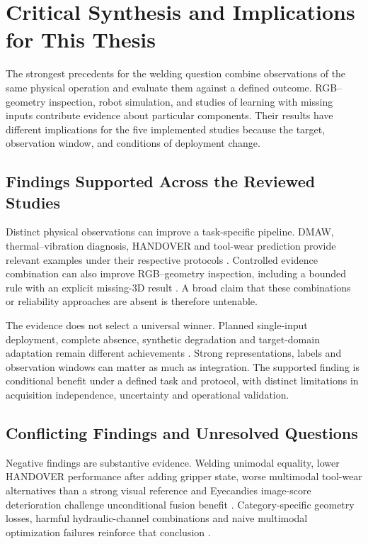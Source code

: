 \section{Critical Synthesis and Implications for This Thesis}
The strongest precedents for the welding question combine observations of the same physical operation and evaluate them against a defined outcome. RGB--geometry inspection, robot simulation, and studies of learning with missing inputs contribute evidence about particular components. Their results have different implications for the five implemented studies because the target, observation window, and conditions of deployment change.

\subsection{Findings Supported Across the Reviewed Studies}
Distinct physical observations can improve a task-specific pipeline. DMAW, thermal--vibration diagnosis, HANDOVER and tool-wear prediction provide relevant examples under their respective protocols \citep{P003,Huo2022Multisensor,Thoduka2024Handover,P045}. Controlled evidence combination can also improve RGB--geometry inspection, including a bounded rule with an explicit missing-3D result \citep{P026}. A broad claim that these combinations or reliability approaches are absent is therefore untenable.

The evidence does not select a universal winner. Planned single-input deployment, complete absence, synthetic degradation and target-domain adaptation remain different achievements \citep{Li2025PGMTKD,Altinses2023Fuzzy,P051}. Strong representations, labels and observation windows can matter as much as integration. The supported finding is conditional benefit under a defined task and protocol, with distinct limitations in acquisition independence, uncertainty and operational validation.

\subsection{Conflicting Findings and Unresolved Questions}
Negative findings are substantive evidence. Welding unimodal equality, lower HANDOVER performance after adding gripper state, worse multimodal tool-wear alternatives than a strong visual reference and Eyecandies image-score deterioration challenge unconditional fusion benefit \citep{Hua2026Weld,Thoduka2024Handover,P045,P033}. Category-specific geometry losses, harmful hydraulic-channel combinations and naive multimodal optimization failures reinforce that conclusion \citep{Horwitz2023Back,Bonfiglioli2023The,Goodarzi2023Deep,Wang2020What}.

